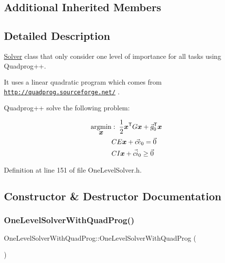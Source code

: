 \subsection*{Additional Inherited Members}


\subsection{Detailed Description}
\hyperlink{classocra_1_1Solver}{Solver} class that only consider one level of importance for all tasks using Quadprog++. 

It uses a linear quadratic program which comes from \href{http://quadprog.sourceforge.net/}{\tt http\+://quadprog.\+sourceforge.\+net/} .

Quadprog++ solve the following problem\+:

\begin{align*} \underset{\mbox{\boldmath${x}$}}{\operatorname{argmin}} &: \; \frac{1}{2} \mbox{\boldmath${x}$}^{\mathsf{T}} G \mbox{\boldmath${x}$} + \vec{g}_0^{\mathsf{T}} \mbox{\boldmath${x}$} \\ & CE \mbox{\boldmath${x}$} + \vec{ce}_0 = \vec{0} \\ & CI \mbox{\boldmath${x}$} + \vec{ci}_0 \geq \vec{0} \end{align*} 

Definition at line 151 of file One\+Level\+Solver.\+h.



\subsection{Constructor \& Destructor Documentation}
\hypertarget{classocra_1_1OneLevelSolverWithQuadProg_a0d7f639dd36c79056c264f0c09d5be50}{}\label{classocra_1_1OneLevelSolverWithQuadProg_a0d7f639dd36c79056c264f0c09d5be50} 
\subsubsection{\texorpdfstring{One\+Level\+Solver\+With\+Quad\+Prog()}{OneLevelSolverWithQuadProg()}}
{\footnotesize\ttfamily One\+Level\+Solver\+With\+Quad\+Prog\+::\+One\+Level\+Solver\+With\+Quad\+Prog (\begin{DoxyParamCaption}{ }\end{DoxyParamCaption})}

